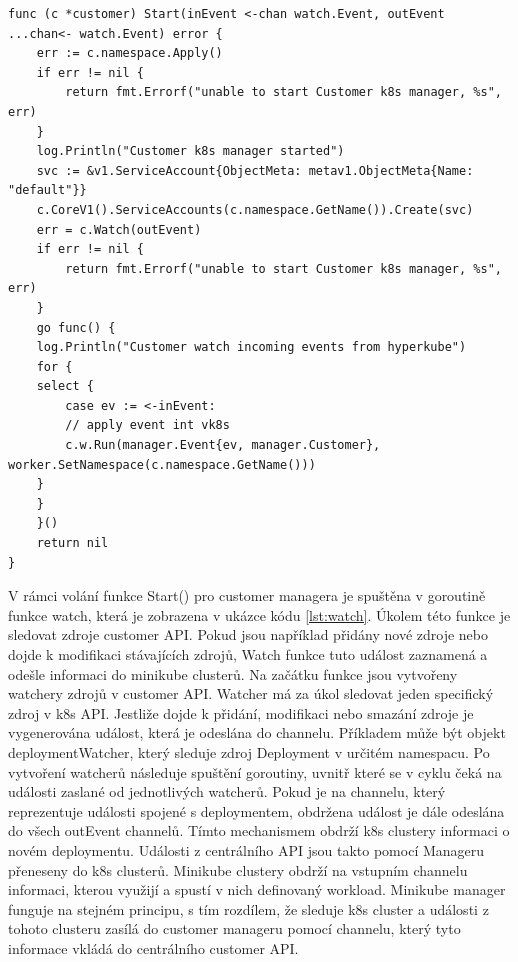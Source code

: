 \begin{lstlisting}[caption={funkce Start Customer managera},label=lst:customer]
func (c *customer) Start(inEvent <-chan watch.Event, outEvent ...chan<- watch.Event) error {
	err := c.namespace.Apply()
	if err != nil {
		return fmt.Errorf("unable to start Customer k8s manager, %s", err)
	}
	log.Println("Customer k8s manager started")
	svc := &v1.ServiceAccount{ObjectMeta: metav1.ObjectMeta{Name: "default"}}
	c.CoreV1().ServiceAccounts(c.namespace.GetName()).Create(svc)
	err = c.Watch(outEvent)
	if err != nil {
		return fmt.Errorf("unable to start Customer k8s manager, %s", err)
	}
	go func() {
	log.Println("Customer watch incoming events from hyperkube")
	for {
	select {
		case ev := <-inEvent:
		// apply event int vk8s
		c.w.Run(manager.Event{ev, manager.Customer}, worker.SetNamespace(c.namespace.GetName()))
	}
	}
	}()
	return nil
}
\end{lstlisting}
\par																																					    V rámci volání funkce Start() pro customer managera je spuštěna v goroutině funkce watch, která je zobrazena v ukázce kódu \ref{lst:watch}. Úkolem této funkce je sledovat zdroje customer API. Pokud jsou například přidány nové zdroje nebo dojde k modifikaci stávajících zdrojů, Watch funkce tuto událost zaznamená a odešle informaci do minikube clusterů. Na začátku funkce jsou vytvořeny watchery zdrojů v customer API. Watcher má za úkol sledovat jeden specifický zdroj v k8s API. Jestliže dojde k přidání, \linebreak modifikaci nebo smazání zdroje je vygenerována událost, která je odeslána do channelu. Příkladem může být objekt deploymentWatcher, který sleduje zdroj Deployment \linebreak v určitém namespacu. Po vytvoření watcherů následuje spuštění goroutiny, uvnitř které se v cyklu čeká na události zaslané od jednotlivých watcherů. Pokud je na channelu, který reprezentuje události spojené s deploymentem, obdržena událost je dále odeslána do všech outEvent channelů. Tímto mechanismem obdrží k8s clustery informaci o novém deploymentu. Události z centrálního API jsou takto pomocí Manageru přeneseny do k8s clusterů. Minikube clustery obdrží na vstupním channelu informaci, kterou využijí a spustí v nich definovaný workload. Minikube manager funguje na stejném principu, s tím rozdílem, že sleduje k8s cluster a události z tohoto clusteru zasílá do customer manageru pomocí channelu, který tyto informace vkládá do centrálního customer API. 
